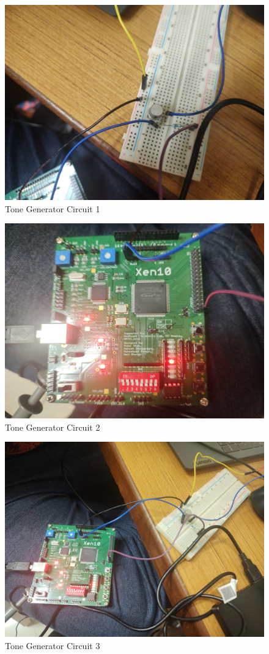 \documentclass[12pt]{article}
\begin{document}
\begin{figure}[H]
\centering
  \includegraphics[scale=0.2]{Images/ToneGen_Circuit1.jpg}
  \caption{Tone Generator Circuit 1}
\end{figure}

\begin{figure}[H]
\centering
  \includegraphics[scale=0.2]{Images/ToneGen_Circuit2.jpg}
  \caption{Tone Generator Circuit 2}
\end{figure}

\begin{figure}[H]
\centering
  \includegraphics[scale=0.2]{Images/ToneGen_Circuit3.jpg}
  \caption{Tone Generator Circuit 3}
\end{figure}
\end{document}
